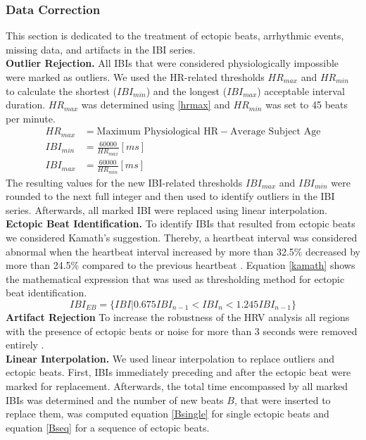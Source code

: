 \subsubsection{Data Correction}
This section is dedicated to the treatment of ectopic beats, arrhythmic events, missing data, and artifacts in the IBI series. \\
\textbf{Outlier Rejection.} All IBIs that were considered physiologically impossible were marked as outliers. We used the HR-related thresholds $HR_{max}$ and $HR_{min}$ to calculate the shortest ($IBI_{min}$) and the longest ($IBI_{max}$) acceptable interval duration. $HR_{max}$ was determined using \ref{hrmax} and $HR_{min}$ was set to 45 beats per minute.
\begin{align}\label{hrmax}
HR_{max} &= \text{Maximum Physiological HR} - \text{Average Subject Age}\\
IBI_{min} &= \frac{60000}{HR_{max}}	[ms]\\
IBI_{max} &= \frac{60000}{HR_{min}}	[ms]
\end{align}
The resulting values for the new IBI-related thresholds $IBI_{max}$ and $IBI_{min}$ were rounded to the next full integer and then used to identify outliers in the IBI series. Afterwards, all marked IBI were replaced using linear interpolation.\\
\textbf{Ectopic Beat Identification.} To identify IBIs that resulted from ectopic beats we considered Kamath's suggestion. Thereby, a heartbeat interval was considered abnormal when the heartbeat interval increased by more than 32.5\% decreased by more than 24.5\% compared to the previous heartbeat \cite{Choi2016}. Equation \ref{kamath} shows the mathematical expression that was used as thresholding method for ectopic beat identification. 
\begin{equation} \label{kamath}
IBI_{EB} = \lbrace IBI\vert 0.675 IBI_{n-1} < IBI_{n} < 1.245 IBI_{n-1}\rbrace  
\end{equation}
\textbf{Artifact Rejection} To increase the robustness of the HRV analysis all regions with the presence of ectopic beats or noise for more than 3 seconds were removed entirely \cite{Clifford2002}.\\
\textbf{Linear Interpolation.} We used linear interpolation to replace outliers and ectopic beats. First, IBIs immediately preceding and after the ectopic beat were marked for replacement. Afterwards, the total time encompassed by all marked IBIs was determined and the number of new beats $B$, that were inserted to replace them, was computed equation \ref{Bsingle} for single ectopic beats and equation \ref{Bseq} for a sequence of ectopic beats.
